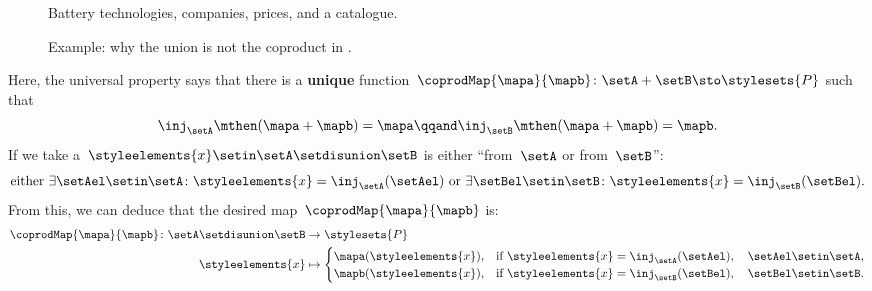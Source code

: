 \begin{example}
    \begin{figure*}[tbh]
        \centering
        \caption{Battery technologies, companies, prices, and a catalogue.}
        \label{fig:coprod_batteries_1}
    \end{figure*}

    \begin{figure*}[tbh]
        \centering
        \caption{Example: why the union is not the coproduct in \Set.}
        \label{fig:coprod_batteries_2}
    \end{figure*}

    Here, the universal property says that there is a \textbf{unique} function~$\coprodMap{\mapa}{\mapb}\colon \setA+\setB \sto \stylesets{P}$ such that
    \begin{equation}
        \label{eq:exa-batt-factoring-maps}
        \inj_\setA\mthen (\mapa+ \mapb)=\mapa
        \qqand
        \inj_\setB\mthen (\mapa+ \mapb)=\mapb.
    \end{equation}
    If we take a~$\styleelements{x}\setin \setA \setdisunion \setB$ is either ``from~$\setA$ or from~$\setB$'':
    \begin{equation}
        \label{eq:exa-batt-explain-sum-map}
        \text{either } \exists \setAel\setin \setA\colon \styleelements{x}=\inj_\setA(\setAel) \text{ or }\exists \setBel\setin \setB\colon \styleelements{x}=\inj_\setB(\setBel).
    \end{equation}
    From this, we can deduce that the desired map~$\coprodMap{\mapa}{\mapb}$ is:
    \begin{equation}
        \label{eq:exa-batt-def-sum-map}
        \begin{aligned}
            \coprodMap{\mapa}{\mapb} \colon  \setA \setdisunion \setB & \to \stylesets{P} \\
            \styleelements{x}                                         & \mapsto
            \begin{cases}
                \mapa(\styleelements{x}), & \text{if } \styleelements{x}=\inj_\setA(\setAel),\quad \setAel \setin \setA, \\
                \mapb(\styleelements{x}), & \text{if } \styleelements{x}=\inj_\setB(\setBel),\quad \setBel \setin \setB.
            \end{cases}
        \end{aligned}
    \end{equation}

\end{example}
